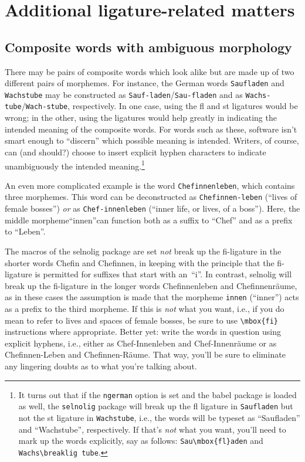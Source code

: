 \documentclass[11pt]{article}
\newcommand{\pkg}[1]{\textsf{#1}}
\newcommand{\opt}[1]{\texttt{#1}}
\begin{document}
\section{Additional ligature-related matters}
\label{sec:options}


\subsection{Composite words with ambiguous morphology}

There may be pairs of composite words which look alike but are made up of two different pairs of morphemes. For instance, the German words \opt{Saufladen} and \opt{Wachstube} may be constructed as \opt{Sauf-laden}\slash \opt{Sau-fladen} and as \opt{Wachs-tube}\slash \opt{Wach-stube}, respectively. In one case, using the fl and st ligatures would be wrong; in the other, using the ligatures would help greatly in indicating the intended meaning of the composite words. 
For words such as these, software isn't smart enough to \enquote{discern} which possible meaning is intended. Writers, of course, can (and should?) choose to insert explicit hyphen characters to indicate unambiguously the intended meaning.\footnote{It turns out that if the \opt{ngerman} option is set and the \pkg{babel} package is loaded as well, the \opt{selnolig} package will break up the fl ligature in \opt{Saufladen} but not the st ligature in \opt{Wachstube}, i.e., the words will be typeset as \enquote{Saufladen} and \enquote{Wachstube}, respectively. If that's \emph{not} what you want, you'll need to mark up the words explicitly, say as follows: \Verb+Sau\mbox{fl}aden+ and \Verb+Wachs\breaklig tube+. }

An even more complicated example is the word \opt{Chefinnenleben}, which contains three morphemes. This word can be deconstructed as \opt{Chefinnen-leben} (\enquote{lives of female bosses}) \emph{or} as \opt{Chef-innenleben} (\enquote{inner life, or lives, of a boss}). Here, the middle morpheme\textemdash\enquote{innen}\textemdash can function both as a suffix to \enquote{Chef} and as a prefix to \enquote{Leben}. 

The macros of the \pkg{selnolig} package are set \emph{not} break up the fi-ligature in the shorter words Chefin and Chefinnen, in keeping with the principle that the fi-ligature is permitted for suffixes that start with an~\enquote{i}. In contrast, \pkg{selnolig} will break up the fi-ligature in the longer words Chefinnenleben and Chefinnenräume, as in these cases the assumption is made that the morpheme \opt{innen} (\enquote{inner}) acts as a prefix to the third morpheme. If this is \emph{not} what you want, i.e., if you do mean to refer to lives and spaces of female bosses, be sure to use \Verb+\mbox{fi}+ instructions where appropriate. Better yet: write the words in question using explicit hyphens, i.e., either as Chef-Innenleben and Chef-Innenräume or as Chefinnen-Leben and Chefinnen-Räume. That way, you'll be sure to eliminate any lingering doubts as to what you're talking about.
\end{document}
